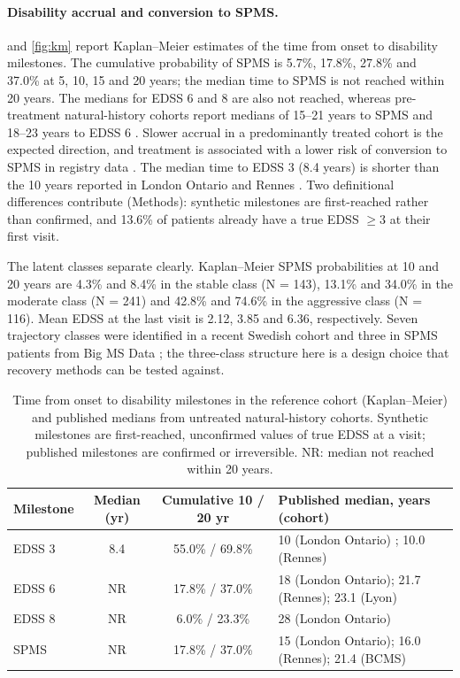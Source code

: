 \documentclass[11pt,a4paper]{article}
\begin{document}
\paragraph{Disability accrual and conversion to SPMS.}
 and \cref{fig:km} report Kaplan--Meier estimates of the time from onset to disability milestones. The cumulative probability of SPMS is 5.7\%, 17.8\%, 27.8\% and 37.0\% at 5, 10, 15 and 20 years; the median time to SPMS is not reached within 20 years. The medians for EDSS 6 and 8 are also not reached, whereas pre-treatment natural-history cohorts report medians of 15--21 years to SPMS and 18--23 years to EDSS 6 \cite{scalfari2010,leray2010,confavreux2006,koch2010}. Slower accrual in a predominantly treated cohort is the expected direction, and treatment is associated with a lower risk of conversion to SPMS in registry data \cite{brown2019}. The median time to EDSS 3 (8.4 years) is shorter than the 10 years reported in London Ontario and Rennes \cite{scalfari2010,leray2010}. Two definitional differences contribute (Methods): synthetic milestones are first-reached rather than confirmed, and 13.6\% of patients already have a true EDSS $\geq 3$ at their first visit.

The latent classes separate clearly. Kaplan--Meier SPMS probabilities at 10 and 20 years are 4.3\% and 8.4\% in the stable class (N = 143), 13.1\% and 34.0\% in the moderate class (N = 241) and 42.8\% and 74.6\% in the aggressive class (N = 116). Mean EDSS at the last visit is 2.12, 3.85 and 6.36, respectively. Seven trajectory classes were identified in a recent Swedish cohort \cite{guo2026} and three in SPMS patients from Big MS Data \cite{signori2023}; the three-class structure here is a design choice that recovery methods can be tested against.

\begin{table}[htbp]
\centering
\caption{Time from onset to disability milestones in the reference cohort (Kaplan--Meier) and published medians from untreated natural-history cohorts. Synthetic milestones are first-reached, unconfirmed values of true EDSS at a visit; published milestones are confirmed or irreversible. NR: median not reached within 20 years.}
\label{tab:milestones}
\small
\begin{tabular}{lccp{6.6cm}}
\toprule
\textbf{Milestone} & \textbf{Median (yr)} & \textbf{Cumulative 10 / 20 yr} & \textbf{Published median, years (cohort)}\\
\midrule
EDSS 3 & 8.4 & 55.0\% / 69.8\% & 10 (London Ontario) \cite{scalfari2010}; 10.0 (Rennes) \cite{leray2010}\\
EDSS 6 & NR & 17.8\% / 37.0\% & 18 (London Ontario); 21.7 (Rennes); 23.1 (Lyon) \cite{scalfari2010,leray2010,confavreux2006}\\
EDSS 8 & NR & 6.0\% / 23.3\% & 28 (London Ontario) \cite{scalfari2010}\\
SPMS & NR & 17.8\% / 37.0\% & 15 (London Ontario); 16.0 (Rennes); 21.4 (BCMS) \cite{scalfari2010,leray2010,koch2010}\\
\bottomrule
\end{tabular}
\end{table}
\end{document}
